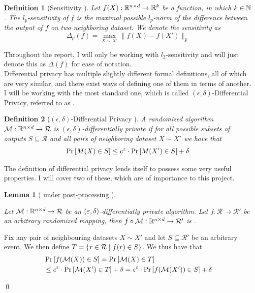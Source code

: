 \documentclass[a4paper,12pt]{article}
\renewenvironment{proof}{{\textit{Proof} \\}}{\qed}
\newtheorem{definition}{Definition}[section]
\newtheorem{lemma}{Lemma}[section]
\begin{document}
\begin{definition}[Sensitivity ] %
\label{def:sensitivity}
Let $f(X): \mathbb{R}^{n \times d} \rightarrow \mathbb{R}^k$ be a function, in which $k \in \mathbb{N}$.
The $l_p$-sensitivity of $f$ is the maximal
possible $l_p$-norm of the difference between the output of $f$
on two neighboring dataset.
We denote the sensitivity as
\[
\Delta_p (f) = \max_{X \sim X'} \| f(X) - f(X') \|_p
\]
\end{definition}
\noindent Throughout the report, I will only be working with $l_2$-sensitivity and
will just denote this as $\Delta(f)$ for ease of notation. \\

Differential privacy has multiple slightly different
formal definitions, all of which are very similar, and there exist ways of
defining one of them in terms of another.
I will be working with the most standard one, which is called $(\epsilon, \delta)$-Differential Privacy,
referred to as \edp.
\vspace*{0.3cm}
\begin{definition}[$(\epsilon, \delta)$-Differential Privacy ]

A randomized algorithm $\mathcal{M}: \mathbb{R}^{n \times d} \rightarrow \mathcal{R}$
is $(\epsilon, \delta)$-differentially private if for all possible
subsets of outputs $S \subseteq \mathcal{R}$ and all pairs of
neighboring dataset $X \sim X'$ we have that
\[ \Pr\left [M(X) \in S \right] \le e^{\varepsilon} \cdot \Pr\left [M(X') \in S \right] + \delta \]

\end{definition}

\noindent The definition of differential privacy lends itself to possess some very useful properties.
I will cover two of these, which are of importance to this project.

\begin{lemma}[ \edp under post-processing ] %
\label{lem:PostProc}

Let $\mathcal{M}: \mathbb{R}^{n \times d} \rightarrow \mathcal{R}$ be an $\left (\varepsilon, \delta\right)$-differentially private 
algorithm. Let $f: \mathcal{R} \rightarrow \mathcal{R}'$ 
be an arbitrary randomized mapping, then 
$f \circ \mathcal{M}: \mathbb{R}^{n \times d} \rightarrow \mathcal{R}'$ is \edp.

\end{lemma}

\begin{proof}

Fix any pair of neighbouring datasets $X \sim X'$ and 
let $S \subseteq \mathcal{R}'$ be an arbitrary event. We then define 
$T = \left \{ r \in \mathcal{R} \; \text{\textbar} \; f(r) \in S\right\}$.
We thus have that
\begin{align*}
    &\Pr\left [f(\mathcal{M}(X)) \in S \right] = \Pr\left [\mathcal{M}(X) \in T \right] \\
    &\le e^{\varepsilon} \cdot \Pr\left [\mathcal{M}(X') \in T \right] + \delta = 
    e^{\varepsilon} \cdot \Pr\left [f(\mathcal{M}(X')) \in S \right] + \delta
\end{align*}
    
\end{proof}
\end{document}
